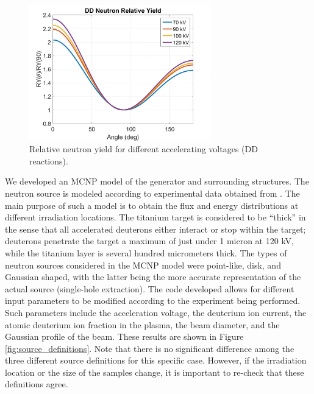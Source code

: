 \documentclass[review]{elsarticle}
\begin{document}
\begin{figure}[H]
	\begin{center}
		\includegraphics[width=0.7\textwidth]{pics/rel_yield} 
		\caption{Relative neutron yield for different accelerating voltages (DD reactions).}
		\label{fig:yield}
	\end{center}
\end{figure}

We developed an MCNP model of the generator and surrounding structures. The neutron source is modeled according to experimental data obtained from \cite{Cross_sections}. The main purpose of such a model is to obtain the flux and energy distributions at different irradiation locations. The titanium target is considered to be ``thick'' in the sense that all accelerated deuterons either interact or stop within the target; deuterons penetrate the target a maximum of just under 1 micron at 120 kV, while the titanium layer is several hundred micrometers thick. The types of neutron sources considered in the MCNP model were point-like, disk, and Gaussian shaped, with the latter being the more accurate representation of the actual source (single-hole extraction). The code developed allows for different input parameters to be modified according to the experiment being performed. Such parameters include the acceleration voltage, the deuterium ion current, the atomic deuterium ion fraction in the plasma, the beam diameter, and the Gaussian profile of the beam. These results are shown in Figure \ref{fig:source_definitions}. Note that there is no significant difference among the three different source definitions for this specific case. However, if the irradiation location or the size of the samples change, it is important to re-check that these definitions agree.   
\end{document}
